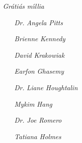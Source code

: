 \thispagestyle{empty}
\vspace*{\fill}
    \textit{Gr\'ati\'as m\'\i llia}
    \begin{itemize}
        \item[\textit{Dr.}] \textit{Angela Pitts}
        \item[] \textit{Brienne Kennedy}
        \item[] \textit{David Krakowiak}
        \item[] \textit{Earfon Ghasemy}
        \item[\textit{Dr.}] \textit{Liane Houghtalin}
        \item[] \textit{Mykim Hang}
        \item[\textit{Dr.}] \textit{Joe Romero}
        \item[] \textit{Tatiana Holmes}
    \end{itemize}
\vspace*{\fill}
\clearpage
